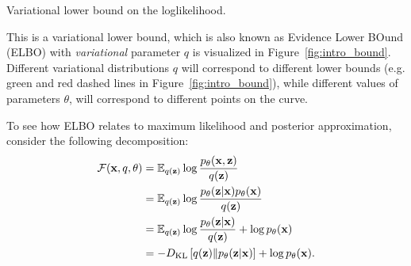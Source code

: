 \begin{marginfigure}[7\baselineskip]
\caption{Variational lower bound on the loglikelihood.}\label{fig:intro_bound}
\end{marginfigure}
This is a variational lower bound, which is also known as Evidence Lower BOund (ELBO) with \textit{variational} parameter $q$ is visualized in Figure~\ref{fig:intro_bound}. Different variational distributions $q$ will correspond to different lower bounds (e.g. green and red dashed lines in Figure~\ref{fig:intro_bound}), while different values of parameters $\theta$, will correspond to different points on the curve. 

To see how ELBO relates to maximum likelihood and posterior approximation,  consider the following decomposition:
\begin{equation}
\begin{aligned}
    \mathcal{F}({\mathbf{x}}, q, \theta) &= \mathbb{E}_{q({\mathbf{z}})}\log  \frac{p_{\theta}({\mathbf{x}},{\mathbf{z}})}{q({\mathbf{z}})} \\
    & = \mathbb{E}_{q({\mathbf{z}})}\log  \frac{p_{\theta}({\mathbf{z}}|{\mathbf{x}})p_{\theta}({\mathbf{x}})}{q({\mathbf{z}})} \\
    & = \mathbb{E}_{q({\mathbf{z}})}\log  \frac{p_{\theta}({\mathbf{z}}|{\mathbf{x}})}{q({\mathbf{z}})} +  \log p_{\theta}({\mathbf{x}})\\
    & = - D_{\mathrm{KL}}\left[q({\mathbf{z}})\|p_{\theta}({\mathbf{z}}|{\mathbf{x}})\right] + \log p_{\theta}({\mathbf{x}}).\\
\end{aligned}
\end{equation}


